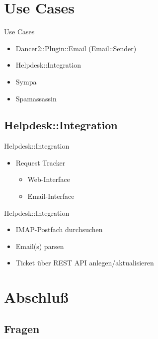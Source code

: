 \section{Use Cases}

\begin{frame}{Use Cases}
  \begin{itemize}
  \item Dancer2::Plugin::Email (Email::Sender)
  \item Helpdesk::Integration
  \item Sympa
  \item Spamassassin
  \end{itemize}
\end{frame}

\subsection{Helpdesk::Integration}

\begin{frame}{Helpdesk::Integration}
  \begin{itemize}
  \item Request Tracker
    \begin{itemize}
    \item Web-Interface
    \item Email-Interface
    \end{itemize}
  \end{itemize}
\end{frame}

\begin{frame}{Helpdesk::Integration}
  \begin{itemize}
  \item IMAP-Postfach durchsuchen
  \item Email(s) parsen
  \item Ticket über REST API anlegen/aktualisieren
  \end{itemize}
\end{frame}

\section{Abschluß}

\subsection{Fragen}

